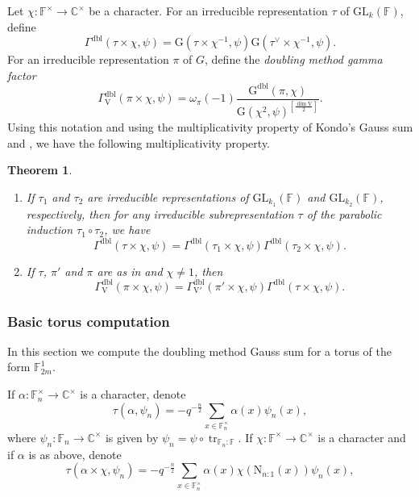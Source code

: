 \documentclass[12pt, reqno]{amsart}
\newtheorem{theorem}{Theorem}[section]
\theoremstyle{definition}
\theoremstyle{definition}
\theoremstyle{definition}
\newcommand{\cComplex}{\mathbb{C}}
\newcommand{\multiplicativegroup}[1]{#1^{\times}}
\newcommand{\hermitianSpace}{\mathrm{V}}
\newcommand{\fieldCharacter}{\psi}
\newcommand{\centralCharacter}[1]{\omega_{#1}}
\newcommand{\Contragradient}[1]{#1^{\vee}}
\newcommand{\trace}{\operatorname{tr}}
\newcommand{\GL}{\mathrm{GL}}
\newcommand{\FieldNorm}[2]{\mathrm{N}_{#1:#2}}
\newcommand{\finiteField}{\mathbb{F}}
\newcommand{\finiteFieldExtension}[1]{\finiteField_{#1}}
\newcommand{\GaussSumScalar}[2]{\mathrm{G}\left(#1, #2\right)}
\newcommand{\dblGaussSumScalar}[2]{\mathrm{G}^{\mathrm{dbl}}\left(#1, #2\right)}
\newcommand{\dblGammaFactor}[3]{\Gamma^{\mathrm{dbl}}\left(#1 \times #2, #3\right)}
\newcommand{\dblGammaFactorSpace}[4]{\Gamma^{\mathrm{dbl}}_{#1}\left(#2 \times #3, #4\right)}
\begin{document}
Let $\chi \colon \multiplicativegroup{\finiteField} \to \multiplicativegroup{\cComplex}$ be a character. For an irreducible representation  $\tau$ of $\GL_k\left(\finiteField\right)$, define $$\dblGammaFactor{\tau}{\chi}{\fieldCharacter} = \GaussSumScalar{\tau \times \chi^{-1}}{\fieldCharacter} \GaussSumScalar{\Contragradient{\tau} \times \chi^{-1}}{\fieldCharacter}.$$
For an irreducible representation $\pi$ of $G$, define the \emph{doubling method gamma factor} $$\dblGammaFactorSpace{\hermitianSpace}{\pi}{\chi}{\fieldCharacter} = \centralCharacter{\pi}\left(-1\right) \frac{\dblGaussSumScalar{\pi}{\chi}}{\GaussSumScalar{\chi^2}{\fieldCharacter}^{\left[\frac{\dim \hermitianSpace}{2}\right]}}.$$
Using this notation and using the multiplicativity property of Kondo's Gauss sum and , we have the following multiplicativity property.

\begin{theorem}
	\begin{enumerate}
		\item If $\tau_1$ and $\tau_2$ are irreducible representations of $\GL_{k_1}\left(\finiteField\right)$ and $\GL_{k_2}\left(\finiteField\right)$, respectively, then for any irreducible subrepresentation $\tau$ of the parabolic induction $\tau_1 \circ \tau_2$, we have
		$$\dblGammaFactor{\tau}{\chi}{\fieldCharacter} = \dblGammaFactor{\tau_1}{\chi}{\fieldCharacter} \dblGammaFactor{\tau_2}{\chi}{\fieldCharacter}.$$
		\item If $\tau$, $\pi'$ and $\pi$ are as in  and $\chi \ne 1$, then
		$$\dblGammaFactorSpace{\hermitianSpace}{\pi}{\chi}{\fieldCharacter} = \dblGammaFactorSpace{\hermitianSpace'}{\pi'}{\chi}{\fieldCharacter} \dblGammaFactor{\tau}{\chi}{\fieldCharacter}.$$
	\end{enumerate}
\end{theorem}

\subsubsection{Basic torus computation}
In this section we compute the doubling method Gauss sum for a torus of the form $\finiteFieldExtension{2m}^1$.

If $\alpha \colon \multiplicativegroup{\finiteFieldExtension{n}} \to \multiplicativegroup{\cComplex}$ is a character, denote $$\tau\left(\alpha, \fieldCharacter_n\right) = -q^{-\frac{n}{2}}\sum_{x \in \multiplicativegroup{\finiteFieldExtension{n}}} \alpha\left(x\right) \fieldCharacter_n\left(x\right),$$
where $\fieldCharacter_n \colon \finiteFieldExtension{n} \to \multiplicativegroup{\cComplex}$ is given by $\fieldCharacter_n = \fieldCharacter \circ \trace_{\finiteFieldExtension{n} : \finiteField}$. If $\chi \colon \multiplicativegroup{\finiteField} \to \multiplicativegroup{\cComplex}$ is a character and if $\alpha$ is as above, denote
$$\tau\left(\alpha \times \chi, \fieldCharacter_n\right) = -q^{-\frac{n}{2}}\sum_{x \in \multiplicativegroup{\finiteFieldExtension{n}}} \alpha\left(x\right) \chi\left( \FieldNorm{n}{1}\left(x\right)\right) \fieldCharacter_n\left(x\right),$$
\end{document}
